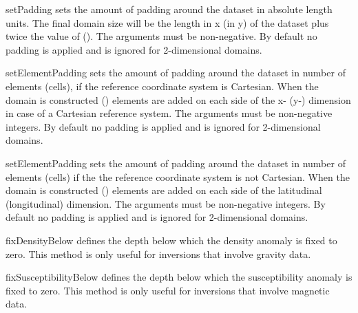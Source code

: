 \begin{methoddesc}[DomainBuilder]{setPadding}{%
%
}
sets the amount of padding around the dataset in absolute length units.
The final domain size will be the length in x (in y) of the dataset plus twice
the value of  (). The arguments must be non-negative.
By default no padding is applied and  is ignored for 2-dimensional
domains.
\end{methoddesc}

\begin{methoddesc}[DomainBuilder]{setElementPadding}{%
%
}
sets the amount of padding around the dataset in number of elements (cells),
if the reference coordinate system is Cartesian. 
When the domain is constructed  () elements are
added on each side of the x- (y-) dimension in case of a Cartesian reference system. The arguments must be non-negative integers.
By default no padding is applied and  is ignored for 2-dimensional
domains.
\end{methoddesc}

\begin{methoddesc}[DomainBuilder]{setElementPadding}{%
%
}
sets the amount of padding around the dataset in number of elements (cells) if the the reference coordinate system is not Cartesian.
When the domain is constructed  () elements are
added on each side of the latitudinal (longitudinal) dimension. The arguments must be non-negative integers.
By default no padding is applied and  is ignored for 2-dimensional
domains.
\end{methoddesc}

\begin{methoddesc}[DomainBuilder]{fixDensityBelow}{%
}
defines the depth below which the density anomaly is fixed to zero.
This method is only useful for inversions that involve gravity data.
\end{methoddesc}

\begin{methoddesc}[DomainBuilder]{fixSusceptibilityBelow}{%
}
defines the depth below which the susceptibility anomaly is fixed to zero.
This method is only useful for inversions that involve magnetic data.
\end{methoddesc}

